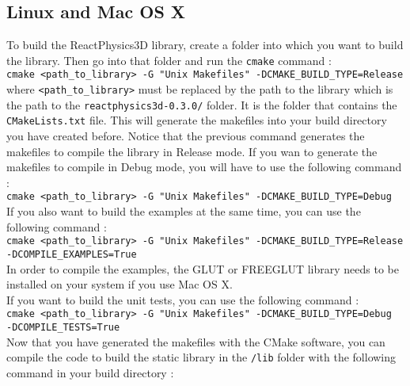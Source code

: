 \documentclass[a4paper,12pt]{article}
\begin{document}
    \subsection{Linux and Mac OS X}  

    To build the ReactPhysics3D library, create a folder into which
    you want to build the library. Then go into that folder and run
    the \texttt{cmake} command : \\

    \texttt{cmake \textless path\_to\_library\textgreater \ -G "Unix Makefiles" -DCMAKE\_BUILD\_TYPE=Release} \\

    where \texttt{\textless path\_to\_library\textgreater} must be replaced
    by the path to the library which is the path to the
    \texttt{reactphysics3d-0.3.0/} folder. It is the folder that
    contains the \texttt{CMakeLists.txt} file. This will generate the
    makefiles into your build directory you have created before. Notice that the previous command generates the makefiles to
    compile the library in Release mode. If you wan to generate the makefiles to
    compile in Debug mode, you will have to use the following command : \\

    \texttt{cmake \textless path\_to\_library\textgreater \ -G "Unix Makefiles" -DCMAKE\_BUILD\_TYPE=Debug} \\

   If you also want to build the examples at the same time, you can
   use the following command :  \\

   \texttt{cmake \textless path\_to\_library\textgreater \ -G "Unix Makefiles" -DCMAKE\_BUILD\_TYPE=Release \\
     -DCOMPILE\_EXAMPLES=True } \\

  In order to compile the examples, the GLUT or FREEGLUT library needs to be
  installed on your system if you use Mac OS X. \\

  If you want to build the unit tests, you can use the following
  command : \\

  \texttt{cmake \textless path\_to\_library\textgreater \ -G "Unix Makefiles" -DCMAKE\_BUILD\_TYPE=Debug \\
     -DCOMPILE\_TESTS=True } \\

  Now that you have generated the makefiles with the CMake software,
  you can compile the code to build the static library in the
  \texttt{/lib} folder with the following command in your build directory : \\
    
\end{document}
